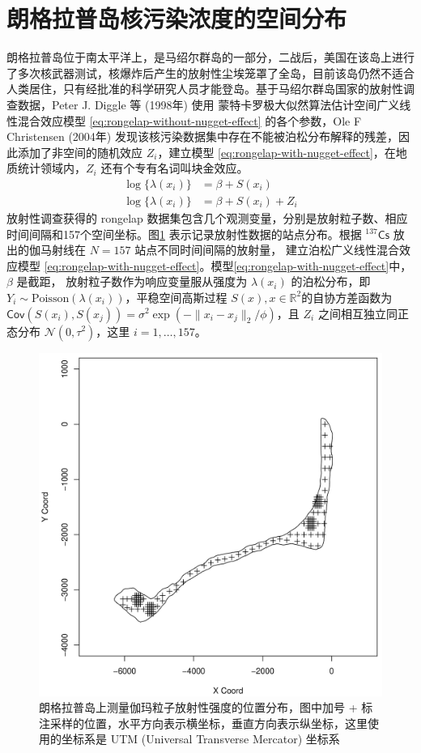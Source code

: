 \documentclass[12pt,a4paper,UTF8,twoside]{book}
\theoremstyle{definition}
\theoremstyle{definition}
\theoremstyle{definition}
\theoremstyle{remark}
\begin{document}
\hypertarget{case-rongelap}{%
\section{朗格拉普岛核污染浓度的空间分布}\label{case-rongelap}}

朗格拉普岛位于南太平洋上，是马绍尔群岛的一部分，二战后，美国在该岛上进行了多次核武器测试，核爆炸后产生的放射性尘埃笼罩了全岛，目前该岛仍然不适合人类居住，只有经批准的科学研究人员才能登岛。基于马绍尔群岛国家的放射性调查数据，Peter
J. Diggle 等 (1998年) \citep{Diggle1998} 使用
蒙特卡罗极大似然算法估计空间广义线性混合效应模型
\eqref{eq:rongelap-without-nugget-effect} 的各个参数，Ole F Christensen
(2004年) \citep{Christensen2004}
发现该核污染数据集中存在不能被泊松分布解释的残差，因此添加了非空间的随机效应
\(Z_i\)，建立模型
\eqref{eq:rongelap-with-nugget-effect}，在地质统计领域内，\(Z_i\)
还有个专有名词叫块金效应。 \begin{align}
\log\{\lambda(x_{i})\}& =  \beta + S(x_{i}) \label{eq:rongelap-without-nugget-effect}\\
\log\{\lambda(x_{i})\}& =  \beta + S(x_{i}) + Z_{i} \label{eq:rongelap-with-nugget-effect}
\end{align} 放射性调查获得的 rongelap
数据集包含几个观测变量，分别是放射粒子数、相应时间间隔和157个空间坐标。图\ref{fig:rongelap-dataset}
表示记录放射性数据的站点分布。根据 \({}^{137}\mathsf{Cs}\)
放出的伽马射线在 \(N=157\) 站点不同时间间隔的放射量，
建立泊松广义线性混合效应模型
\eqref{eq:rongelap-with-nugget-effect}。模型\eqref{eq:rongelap-with-nugget-effect}中，\(\beta\)
是截距， 放射粒子数作为响应变量服从强度为 \(\lambda(x_i)\)
的泊松分布，即
\(Y_{i} \sim \mathrm{Poisson}( \lambda(x_i) )\)，平稳空间高斯过程
\(S(x),x \in \mathbb{R}^2\)的自协方差函数为
\(\mathsf{Cov}( S(x_i), S(x_j) ) = \sigma^2 \exp( -\|x_i -x_j\|_{2} / \phi )\)，且
\(Z_i\) 之间相互独立同正态分布 \(\mathcal{N}(0,\tau^2)\)，这里
\(i = 1,\ldots, 157\)。

\begin{figure}

{\centering \includegraphics[width=0.6\linewidth]{figures/rongelap-island} 

}

\caption{朗格拉普岛上测量伽玛粒子放射性强度的位置分布，图中加号 + 标注采样的位置，水平方向表示横坐标，垂直方向表示纵坐标，这里使用的坐标系是 UTM (Universal Transverse Mercator) 坐标系}\label{fig:rongelap-dataset}
\end{figure}
\end{document}
